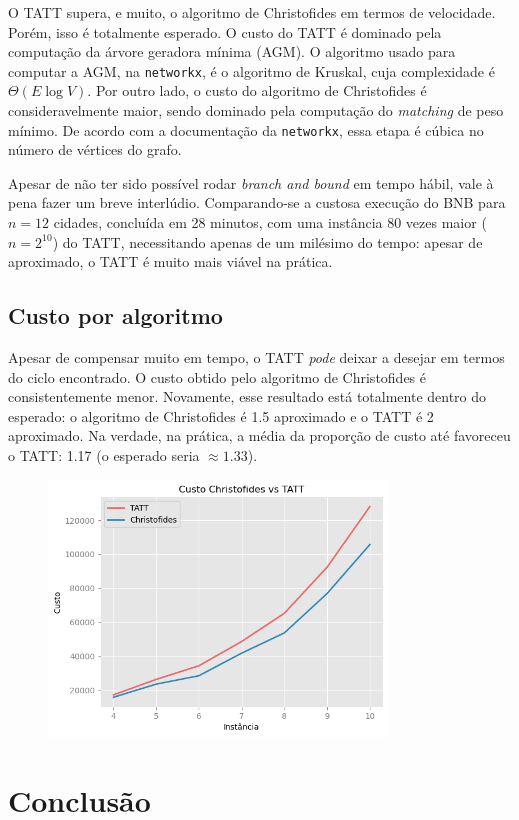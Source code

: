 \documentclass{article}
\begin{document}
O TATT supera, e muito, o algoritmo de Christofides em termos de velocidade. Porém, isso é totalmente esperado. O custo do TATT é dominado pela computação da árvore geradora mínima (AGM). O algoritmo usado para computar a AGM, na \texttt{networkx}, é o algoritmo de Kruskal, cuja complexidade é \( \Theta(E \log V) \). Por outro lado, o custo do algoritmo de Christofides é consideravelmente maior, sendo dominado pela computação do \textit{matching} de peso mínimo. De acordo com a documentação da \texttt{networkx}, essa etapa é cúbica no número de vértices do grafo.

Apesar de não ter sido possível rodar \textit{branch and bound} em tempo hábil, vale à pena fazer um breve interlúdio. Comparando-se a custosa execução do BNB para \( n = 12 \) cidades, concluída em 28 minutos, com uma instância 80 vezes maior (\( n = 2^{10} \)) do TATT, necessitando apenas de um milésimo do tempo: apesar de aproximado, o TATT é muito mais viável na prática.

\subsection{Custo por algoritmo}

Apesar de compensar muito em tempo, o TATT \textit{pode} deixar a desejar em termos do ciclo encontrado. O custo obtido pelo algoritmo de Christofides é consistentemente menor. Novamente, esse resultado está totalmente dentro do esperado: o algoritmo de Christofides é 1.5 aproximado e o TATT é 2 aproximado. Na verdade, na prática, a média da proporção de custo até favoreceu o TATT: 1.17 (o esperado seria \( \approx 1.33 \)).

\begin{figure} [H]
	\includegraphics[width=9cm]{custo_vs}
	\centering
\end{figure}

\section{Conclusão}
\end{document}
